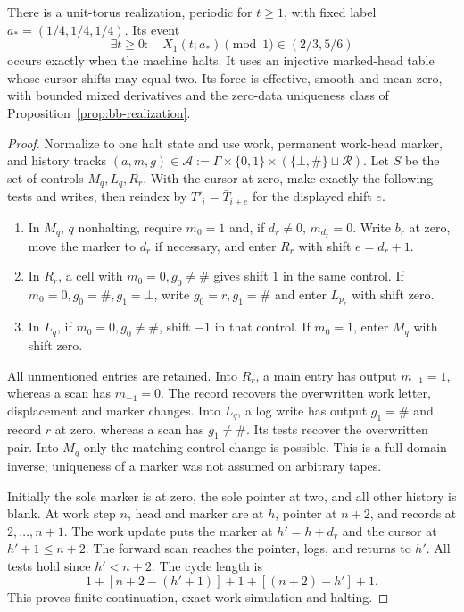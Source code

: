 \begin{theorem}\label{thm:bb-marked-window}
There is a unit-torus realization, periodic for $t\ge1$, with fixed
label $a_*=(1/4,1/4,1/4)$.  Its event
\[ \exists t\ge0:\quad X_1(t;a_*)\pmod1\in(2/3,5/6) \]
occurs exactly when the machine halts.
It uses an injective marked-head table whose cursor shifts may equal
two.  Its force is effective, smooth and mean zero, with bounded
mixed derivatives and the zero-data uniqueness class of
Proposition~\ref{prop:bb-realization}.
\end{theorem}
\begin{proof}\label{proof:bb-marked-window}
Normalize to one halt state and use work, permanent work-head marker,
and history tracks $(a,m,g)\in\mathcal A:=\Gamma\times\{0,1\}\times
(\{\bot,\#\}\sqcup\mathcal R)$.
Let $S$ be the set of controls $M_q,L_q,R_r$.  With the cursor at zero, make
exactly the following tests and writes, then reindex by
$T'_i=\bar T_{i+e}$ for the displayed shift $e$.
\begin{enumerate}
\item In $M_q$, $q$ nonhalting, require $m_0=1$ and, if $d_r\ne0$,
$m_{d_r}=0$.  Write $b_r$ at zero, move the marker to $d_r$ if
necessary, and enter $R_r$ with shift $e=d_r+1$.
\item In $R_r$, a cell with $m_0=0,g_0\ne\#$ gives shift $1$
in the same control.  If $m_0=0,g_0=\#,g_1=\bot$, write
$g_0=r,g_1=\#$ and enter $L_{p_r}$ with shift zero.
\item In $L_q$, if $m_0=0,g_0\ne\#$, shift $-1$ in that control.
If $m_0=1$, enter $M_q$ with shift zero.
\end{enumerate}
All unmentioned entries are retained.  Into $R_r$, a main entry has
output $m_{-1}=1$, whereas a scan has $m_{-1}=0$.
The record recovers the overwritten work letter, displacement and
marker changes.  Into $L_q$, a log write has output $g_1=\#$
and record $r$ at zero, whereas a scan has $g_1\ne\#$.
Its tests recover the overwritten pair.  Into $M_q$ only the
matching control change is possible.  This is a full-domain inverse;
uniqueness of a marker was not assumed on arbitrary tapes.

Initially the sole marker is at zero, the sole pointer at two, and
all other history is blank.  At work step $n$, head and marker are
at $h$, pointer at $n+2$, and records at $2,\ldots,n+1$.
The work update puts the marker at $h'=h+d_r$ and the cursor at
$h'+1\le n+2$.  The forward scan reaches the pointer, logs, and
returns to $h'$.  All tests hold since $h'<n+2$.  The cycle length is
\[
 1+[n+2-(h'+1)]+1+[(n+2)-h']+1.
\]
This proves finite continuation, exact work simulation and halting.


\end{proof}
